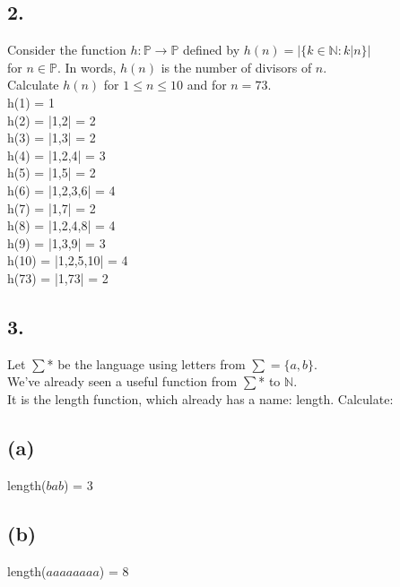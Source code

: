 \documentclass[11pt]{article}
\begin{document}
\subsection*{2.}
\begin{center}
Consider the function $h: \mathbb{P} \rightarrow  \mathbb{P}$ defined by $h(n) = |\{k \in \mathbb{N} : k|n\}|$\\
for $n \in \mathbb{P}$. In words, $h(n)$ is the number of divisors of $n$.\\
Calculate $h(n)$ for $1 \leq n \leq 10$ and for $n = 73$.\\
\hfill \break
h(1) =	1\\
h(2) =	|1,2| = 2\\
h(3) =	|1,3| = 2\\
h(4) =	|1,2,4| = 3\\
h(5) =	|1,5| = 2\\
h(6) =	|1,2,3,6| = 4\\
h(7) =	|1,7| = 2\\
h(8) =	|1,2,4,8| = 4\\
h(9) =	|1,3,9| = 3\\
h(10) =	|1,2,5,10| = 4\\
h(73) =	|1,73| = 2\\
\end{center}
%
%
\hfill \break
\hfill \break
\hfill \break
\subsection*{3.}
\begin{center}
Let $\sum$* be the language using letters from $\sum = \{a,b\}$.\\
We've already seen a useful function from $\sum$* to $\mathbb{N}$.\\
It is the length function, which already has a name: length. Calculate:\\
\end{center}

\subsection*{(a)}
\begin{center}
length($bab$) = 3
\end{center}

\subsection*{(b)}
\begin{center}
length($aaaaaaaa$) = 8
\end{center}
\end{document}
